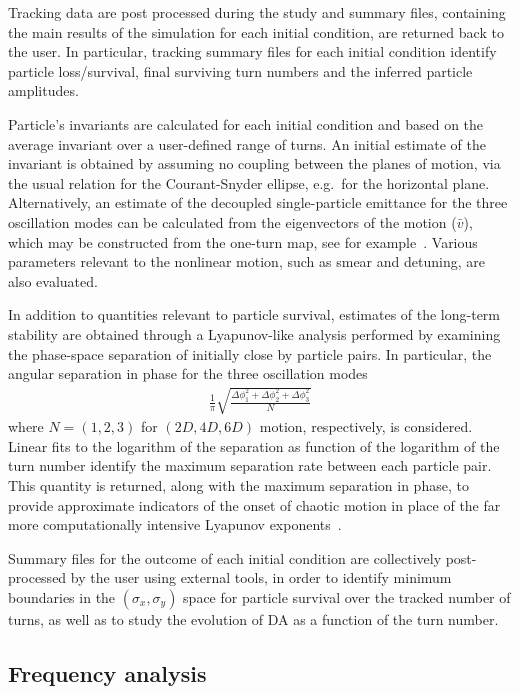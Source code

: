 \documentclass{ws-ijmpa}
\begin{document}
Tracking data are post processed during the study and summary files, containing the main results of the simulation for each initial condition, are returned back to the user. In particular, tracking summary files for each initial condition identify particle loss/survival, final surviving turn numbers and the inferred particle amplitudes.

Particle's invariants are calculated for each initial condition and based on the average invariant over a user-defined range of turns.
An initial estimate of the invariant is obtained by assuming no coupling between the planes of motion, via the usual relation for the Courant-Snyder ellipse, e.g.\ for the horizontal plane.
Alternatively, an estimate of the decoupled single-particle emittance for the three oscillation modes can be calculated from the eigenvectors of the motion ($\bar{v}$), which may be constructed from the one-turn map, see for example~\cite{maisripken}. Various parameters relevant to the nonlinear motion, such as smear and detuning, are also evaluated.

In addition to quantities relevant to particle survival, estimates of the long-term stability are obtained through a Lyapunov-like analysis performed by examining the phase-space separation of initially close by particle pairs. In particular, the angular separation in phase for the three oscillation modes
\begin{align}
&\frac{1}{\pi}\sqrt{\frac{ \Delta\phi_{1}^2 + \Delta\phi_{2}^2 + \Delta\phi_{3}^2 }{N}}&\nonumber
\end{align}
where $N=(1,2,3)$ for $(2D,4D,6D)$ motion, respectively, is considered. Linear fits to the logarithm of the separation as function of the logarithm of the turn number identify the maximum separation rate between each particle pair. This quantity is returned, along with the maximum separation in phase, to provide approximate indicators of the onset of chaotic motion in place of the far more computationally intensive Lyapunov exponents~\cite{chaosproxy,distanceslope}.

Summary files for the outcome of each initial condition are collectively post-processed by the user using external tools, in order to identify minimum boundaries in the $(\sigma_{x},\sigma_{y})$ space for particle survival over the tracked number of turns, as well as to study the evolution of DA as a function of the turn number.

\subsection{Frequency analysis}
\end{document}
